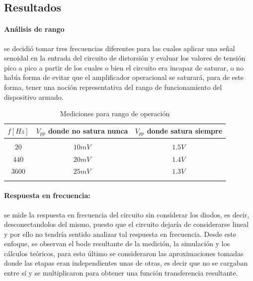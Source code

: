\subsection{Resultados}

\paragraph*{An\'alisis de rango} se decidi\'o tomar tres frecuencias diferentes para las cuales aplicar una se\~nal senoidal en la entrada del circuito de distorsi\'on y evaluar
los valores de tensi\'on pico a pico a partir de los cuales o bien el circuito era incapaz de saturar, o no hab\'ia forma de evitar que el amplificador operacional se saturar\'a, para de este forma,
tener una noci\'on representativa del rango de funcionamiento del dispositivo armado.

\begin{table}[H]
    \centering
    \begin{tabular}{c c c}
        $f [Hz]$ & $V_{pp}$ donde no satura nunca & $V_{pp}$  donde satura siempre \\
        \hline \\
        $20$ & $10mV$ & $1.5V$ \\
        $440$ & $20mV$ & $1.4V$ \\
        $3600$ & $25mV$ & $1.3V$ \\ 
        \hline \\
    \end{tabular}
    \caption{Mediciones para rango de operaci\'on}
\end{table}

\paragraph*{Respuesta en frecuencia:} se mide la respuesta en frecuencia del circuito sin considerar los diodos, es decir, desconectandolos del mismo, puesto que el circuito
dejar\'ia de considerarse lineal y por ello no tendr\'ia sentido analizar tal respuesta en frecuencia. Desde este enfoque, se observan el bode resultante de la medici\'on, la simulaci\'on 
y los c\'alculos te\'oricos, para esto \'ultimo se consideraron las aproximaciones tomadas donde las etapas eran independientes unas de otras, es decir que no se cargaban entre s\'i y se multiplicaron
para obtener una funci\'on transferencia resultante.

